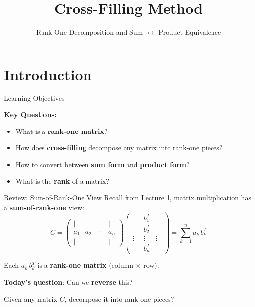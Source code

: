 \documentclass[10pt]{beamer}
\title{Cross-Filling Method}
\subtitle{Rank-One Decomposition and Sum $\leftrightarrow$ Product Equivalence}
\date{}
\theoremstyle{definition}
\newcommand{\x}[1]{\alert{\textbf{#1}}}
\begin{document}
\maketitle

\section{Introduction}

\begin{frame}{Learning Objectives}

\vspace{0.5cm}
\textbf{Key Questions:}
\begin{itemize}
\item What is a \x{rank-one matrix}?
\item How does \x{cross-filling} decompose any matrix into rank-one pieces?
\item How to convert between \x{sum form} and \x{product form}?
\item What is the \x{rank} of a matrix?
\end{itemize}
\end{frame}

\begin{frame}{Review: Sum-of-Rank-One View}
Recall from Lecture 1, matrix multiplication has a \x{sum-of-rank-one} view:
$$C =
\begin{pmatrix}
| & | & & | \\
a_1 & a_2 & \cdots & a_n \\
| & | & & |
\end{pmatrix}
\begin{pmatrix}
- & b_1^T & - \\
- & b_2^T & - \\
\vdots & \vdots & \vdots \\
- & b_n^T & -
\end{pmatrix}
= \sum_{k=1}^{n} a_k \, b_k^T$$

\vfill
Each $a_k \, b_k^T$ is a \x{rank-one matrix} (column $\times$ row).

\vfill
\textbf{Today's question}: Can we \x{reverse} this?

Given any matrix $C$, decompose it into rank-one pieces?
\end{frame}
\end{document}
